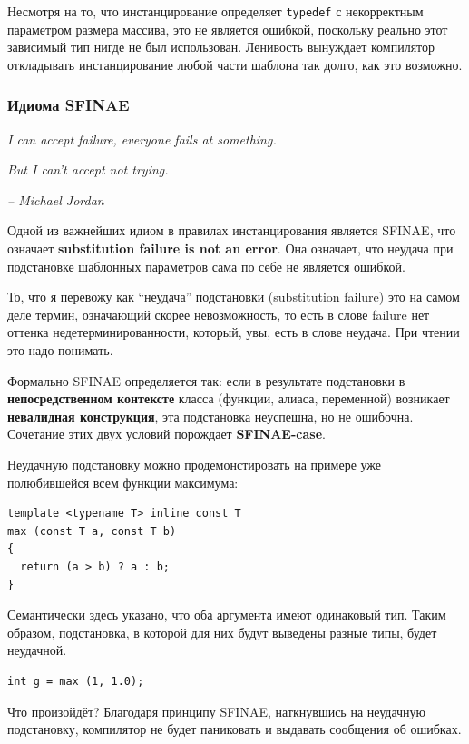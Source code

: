 \documentclass[a4paper,12pt,oneside]{article}
\begin{document}
Несмотря на то, что инстанцирование определяет \lstinline!typedef! с некорректным параметром размера массива, это не является ошибкой, поскольку реально этот зависимый тип нигде не был использован. Ленивость вынуждает компилятор откладывать инстанцирование любой части шаблона так долго, как это возможно.

\subsubsection{Идиома SFINAE}\label{SFINAE}

\hfill\textit{I can accept failure, everyone fails at something.}

\hfill\textit{But I can't accept not trying.}{\vspace{0.5em}}

\hfill\textit{-- Michael Jordan}

Одной из важнейших идиом в правилах инстанцирования является SFINAE, что означает \textbf{substitution failure is not an error}. Она означает, что неудача при подстановке шаблонных параметров сама по себе не является ошибкой.

То, что я перевожу как ``неудача'' подстановки (substitution failure) это на самом деле термин, означающий скорее невозможность, то есть в слове failure нет оттенка недетерминированности, который, увы, есть в слове неудача. При чтении это надо понимать. 

Формально SFINAE определяется так: если в результате подстановки в \textbf{непосредственном контексте} класса (функции, алиаса, переменной) возникает \textbf{невалидная конструкция}, эта подстановка неуспешна, но не ошибочна. Сочетание этих двух условий порождает \textbf{SFINAE-case}.

Неудачную подстановку можно продемонстировать на примере уже полюбившейся всем функции максимума:

\begin{lstlisting}
template <typename T> inline const T
max (const T a, const T b)
{
  return (a > b) ? a : b;
}
\end{lstlisting}

Семантически здесь указано, что оба аргумента имеют одинаковый тип. Таким образом, подстановка, в которой для них будут выведены разные типы, будет неудачной.

\begin{lstlisting}
int g = max (1, 1.0);
\end{lstlisting}

Что произойдёт? Благодаря принципу SFINAE, наткнувшись на неудачную подстановку, компилятор не будет паниковать и выдавать сообщения об ошибках. 
\end{document}
